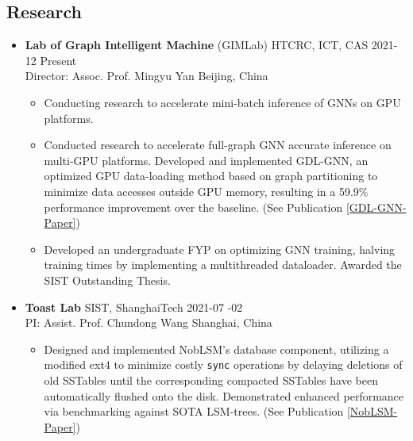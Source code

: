 \documentclass[a4paper,10pt]{ctexart} %
\begin{document}
\begin{keepsection}
\subsection{Research}
\begin{itemize}
    \item \textbf{Lab of Graph Intelligent Machine} (GIMLab) \quad HTCRC, ICT, CAS \hfill 2021-12 \datetlide Present \\
    {\small Director: Assoc. Prof. Mingyu Yan} \hfill Beijing, China
    \begin{small}
        \begin{itemize}
            \item Conducting research to accelerate mini-batch inference of GNNs on GPU platforms.
            \item Conducted research to accelerate full-graph GNN accurate inference on multi-GPU platforms. Developed and implemented GDL-GNN, an optimized GPU data-loading method based on graph partitioning to minimize data accesses outside GPU memory, resulting in a 59.9\% performance improvement over the baseline. (See Publication \ref{GDL-GNN-Paper})
            \item Developed an undergraduate FYP on optimizing GNN training, halving training times by implementing a multithreaded dataloader. Awarded the SIST Outstanding Thesis.
        \end{itemize}
    \end{small}

    \item \textbf{Toast Lab} \quad SIST, ShanghaiTech \hfill 2021-07 -02 \\
    {\small PI: Assist. Prof. Chundong Wang} \hfill Shanghai, China
    \begin{small}
        \begin{itemize}
            \item Designed and implemented NobLSM's database component, utilizing a modified ext4 to minimize costly \texttt{sync} operations by delaying deletions of old SSTables until the corresponding compacted SSTables have been automatically flushed onto the disk. Demonstrated enhanced performance via benchmarking against SOTA LSM-trees. (See Publication \ref{NobLSM-Paper})
        \end{itemize}
    \end{small}


\end{itemize}
\end{keepsection}
\end{document}
